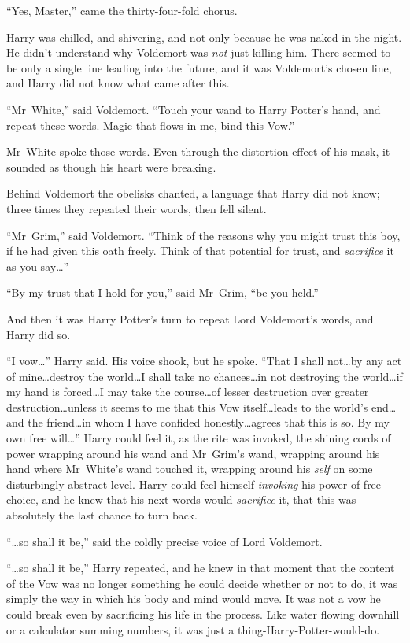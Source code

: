“Yes, Master,” came the thirty-four-fold chorus.

Harry was chilled, and shivering, and not only because he was naked in the night. He didn’t understand why Voldemort was \emph{not} just killing him. There seemed to be only a single line leading into the future, and it was Voldemort’s chosen line, and Harry did not know what came after this.

“Mr~White,” said Voldemort. “Touch your wand to Harry Potter’s hand, and repeat these words. Magic that flows in me, bind this Vow.”

Mr~White spoke those words. Even through the distortion effect of his mask, it sounded as though his heart were breaking.

Behind Voldemort the obelisks chanted, a language that Harry did not know; three times they repeated their words, then fell silent.

“Mr~Grim,” said Voldemort. “Think of the reasons why you might trust this boy, if he had given this oath freely. Think of that potential for trust, and \emph{sacrifice} it as you say…”

“By my trust that I hold for you,” said Mr~Grim, “be you held.”

And then it was Harry Potter’s turn to repeat Lord Voldemort’s words, and Harry did so.

“I vow…” Harry said. His voice shook, but he spoke. “That I shall not…by any act of mine…destroy the world…I shall take no chances…in not destroying the world…if my hand is forced…I may take the course…of lesser destruction over greater destruction…unless it seems to me that this Vow itself…leads to the world’s end…and the friend…in whom I have confided honestly…agrees that this is so. By my own free will…” Harry could feel it, as the rite was invoked, the shining cords of power wrapping around his wand and Mr~Grim’s wand, wrapping around his hand where Mr~White’s wand touched it, wrapping around his \emph{self} on some disturbingly abstract level. Harry could feel himself \emph{invoking} his power of free choice, and he knew that his next words would \emph{sacrifice} it, that this was absolutely the last chance to turn back.

“…so shall it be,” said the coldly precise voice of Lord Voldemort.

“…so shall it be,” Harry repeated, and he knew in that moment that the content of the Vow was no longer something he could decide whether or not to do, it was simply the way in which his body and mind would move. It was not a vow he could break even by sacrificing his life in the process. Like water flowing downhill or a calculator summing numbers, it was just a thing-Harry-Potter-would-do.

